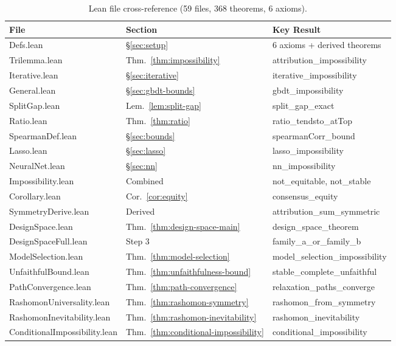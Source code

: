 \documentclass{article}
\begin{document}
\begin{table}[t]
\centering
\caption{Lean file cross-reference (59 files, 368 theorems, 6 axioms).}
\label{tab:lean-crossref}
\footnotesize
\begin{tabular}{@{}lll@{}}
\toprule
\textbf{File} & \textbf{Section} & \textbf{Key Result} \\
\midrule
Defs.lean & \S\ref{sec:setup} & 6 axioms + derived theorems \\
Trilemma.lean & Thm.~\ref{thm:impossibility} & attribution\_impossibility \\
Iterative.lean & \S\ref{sec:iterative} & iterative\_impossibility \\
General.lean & \S\ref{sec:gbdt-bounds} & gbdt\_impossibility \\
SplitGap.lean & Lem.~\ref{lem:split-gap} & split\_gap\_exact \\
Ratio.lean & Thm.~\ref{thm:ratio} & ratio\_tendsto\_atTop \\
SpearmanDef.lean & \S\ref{sec:bounds} & spearmanCorr\_bound \\
Lasso.lean & \S\ref{sec:lasso} & lasso\_impossibility \\
NeuralNet.lean & \S\ref{sec:nn} & nn\_impossibility \\
Impossibility.lean & Combined & not\_equitable, not\_stable \\
Corollary.lean & Cor.~\ref{cor:equity} & consensus\_equity \\
SymmetryDerive.lean & Derived & attribution\_sum\_symmetric \\
DesignSpace.lean & Thm.~\ref{thm:design-space-main} & design\_space\_theorem \\
DesignSpaceFull.lean & Step 3 & family\_a\_or\_family\_b \\
ModelSelection.lean & Thm.~\ref{thm:model-selection} & model\_selection\_impossibility \\
UnfaithfulBound.lean & Thm.~\ref{thm:unfaithfulness-bound} & stable\_complete\_unfaithful \\
PathConvergence.lean & Thm.~\ref{thm:path-convergence} & relaxation\_paths\_converge \\
RashomonUniversality.lean & Thm.~\ref{thm:rashomon-symmetry} & rashomon\_from\_symmetry \\
RashomonInevitability.lean & Thm.~\ref{thm:rashomon-inevitability} & rashomon\_inevitability \\
ConditionalImpossibility.lean & Thm.~\ref{thm:conditional-impossibility} & conditional\_impossibility \\

\end{tabular}
\end{table}
\end{document}
